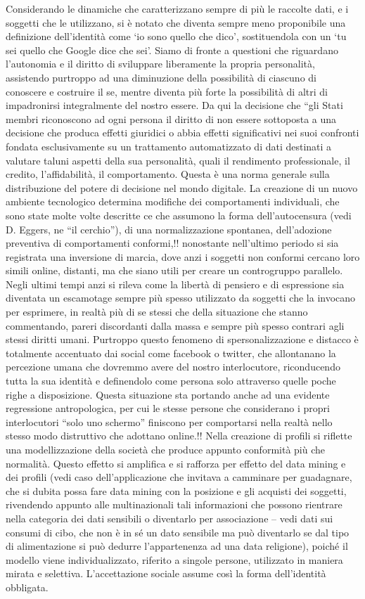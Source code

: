 Considerando le dinamiche che caratterizzano sempre di più le raccolte dati, e i soggetti che le utilizzano, si è notato che diventa sempre meno proponibile una definizione dell’identità come ‘io sono quello che dico’, sostituendola con un ‘tu sei quello che  Google dice che sei’.
Siamo di fronte a questioni che riguardano l’autonomia e il diritto di sviluppare liberamente la propria personalità, assistendo purtroppo ad una diminuzione della possibilità di ciascuno di conoscere e costruire il se, mentre diventa più forte la possibilità di altri di impadronirsi integralmente del nostro essere.
Da qui la decisione che “gli Stati membri riconoscono ad ogni persona il diritto di non essere sottoposta a una decisione che produca effetti giuridici o abbia effetti significativi nei suoi confronti fondata esclusivamente su un trattamento automatizzato di dati destinati a valutare taluni aspetti della sua personalità, quali il rendimento professionale, il credito, l’affidabilità, il comportamento. Questa è una norma generale sulla distribuzione del potere di decisione nel mondo digitale.
La creazione di un nuovo ambiente tecnologico determina modifiche dei comportamenti individuali, che sono state molte volte descritte ce che assumono la forma dell’autocensura (vedi D. Eggers, ne “il cerchio”), di una normalizzazione spontanea, dell’adozione preventiva di comportamenti conformi,!! nonostante nell’ultimo periodo si sia registrata una inversione di marcia, dove anzi i soggetti non conformi cercano loro simili online, distanti, ma che siano utili per creare un controgruppo parallelo. Negli ultimi tempi anzi si rileva come la libertà di pensiero e di espressione sia diventata un escamotage sempre più spesso utilizzato da soggetti che la invocano per esprimere, in realtà più di se stessi che della situazione che stanno commentando, pareri discordanti dalla massa e sempre più spesso contrari agli stessi diritti umani. Purtroppo questo fenomeno di spersonalizzazione e distacco è totalmente accentuato dai social come facebook o twitter, che allontanano la percezione umana che dovremmo avere del nostro interlocutore, riconducendo tutta la sua identità e definendolo come persona solo attraverso quelle poche righe a disposizione. Questa situazione sta portando anche ad una evidente regressione antropologica, per cui le stesse persone che considerano i propri interlocutori “solo uno schermo” finiscono per comportarsi nella realtà nello stesso modo distruttivo che adottano online.!!
Nella creazione di profili si riflette una modellizzazione della società che produce appunto conformità più che normalità. Questo effetto si amplifica e si rafforza per effetto del data mining e dei profili (vedi caso dell’applicazione che invitava a camminare per guadagnare, che si dubita possa fare data mining con la posizione e gli acquisti dei soggetti, rivendendo appunto alle multinazionali tali informazioni che possono rientrare nella categoria dei dati sensibili o diventarlo per associazione – vedi dati sui consumi di cibo, che non è in sé un dato sensibile ma può diventarlo se dal tipo di alimentazione si può dedurre l’appartenenza ad una data religione), poiché il modello viene individualizzato, riferito a singole persone, utilizzato in maniera mirata e selettiva. L’accettazione sociale assume così la forma dell’identità obbligata. 

